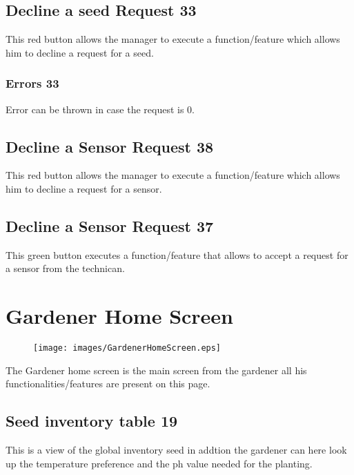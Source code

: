
\subsection{Decline a seed Request 33}
This red button allows the manager to execute a function/feature which allows
him to decline a request for a seed.

\subsubsection{Errors 33}
Error can be thrown in case the request is 0.


\subsection{Decline a Sensor Request 38}
This red button allows the manager to execute a function/feature which allows
him to decline a request for a sensor.
\subsection{Decline a Sensor Request 37}
This green button executes a function/feature that allows to accept a request
for a sensor from the technican.





\section{Gardener Home Screen}
\label{sec:appendix_Gardener_Home_Screen}

\begin{figure}[H]
\texttt{[image: images/GardenerHomeScreen.eps]}
\end{figure}

The Gardener home screen is the main screen from the gardener all his
functionalities/features are present on this page.



\subsection{Seed inventory table 19}
This is a view of the global inventory seed in addtion the gardener can here
look up the temperature preference and the ph value needed for the planting.

